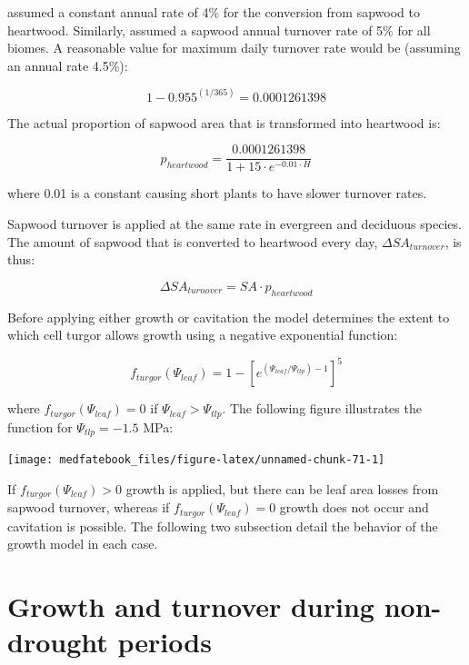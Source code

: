 \documentclass[]{book}
\begin{document}
\citet{Prentice1993} assumed a constant annual rate of 4\% for the
conversion from sapwood to heartwood. Similarly, \citet{Sitch2003}
assumed a sapwood annual turnover rate of 5\% for all biomes. A
reasonable value for maximum daily turnover rate would be (assuming an
annual rate 4.5\%):

\begin{equation}
1-0.955^{(1/365)} = 0.0001261398
\end{equation}

The actual proportion of sapwood area that is transformed into heartwood
is:

\begin{equation}
p_{heartwood} = \frac{0.0001261398}{1+15\cdot e^{-0.01\cdot H}}
\end{equation}

where 0.01 is a constant causing short plants to have slower turnover
rates.

Sapwood turnover is applied at the same rate in evergreen and deciduous
species. The amount of sapwood that is converted to heartwood every day,
\(\Delta SA_{turnover}\), is thus:

\begin{equation}
\Delta SA_{turnover} = SA \cdot p_{heartwood}
\end{equation}

Before applying either growth or cavitation the model determines the
extent to which cell turgor allows growth using a negative exponential
function:

\begin{equation}
f_{turgor}(\Psi_{leaf}) = 1 - \left[e^{(\Psi_{leaf}/\Psi_{tlp})-1}\right]^5
\end{equation}

where \(f_{turgor}(\Psi_{leaf})=0\) if \(\Psi_{leaf} > \Psi_{tlp}\). The
following figure illustrates the function for \(\Psi_{tlp}=-1.5\) MPa:

\begin{center}\texttt{[image: medfatebook\_files/figure-latex/unnamed-chunk-71-1]} \end{center}

If \(f_{turgor}(\Psi_{leaf})>0\) growth is applied, but there can be
leaf area losses from sapwood turnover, whereas if
\(f_{turgor}(\Psi_{leaf}) = 0\) growth does not occur and cavitation is
possible. The following two subsection detail the behavior of the growth
model in each case.

\section{Growth and turnover during non-drought
periods}\label{growth-and-turnover-during-non-drought-periods}
\end{document}
